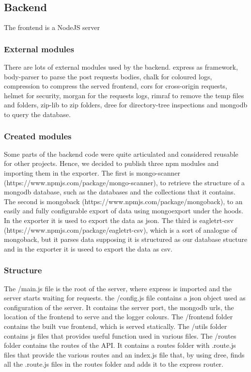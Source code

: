 \subsection{Backend}
The frontend is a NodeJS server

\subsubsection{External modules}
There are lots of external modules used by the backend.
express as framework, body-parser to parse the post requests bodies, chalk for coloured logs, compression to compress the served frontend, 
cors for cross-origin requests, helmet for security, morgan for the requests logs, rimraf to remove the temp files and folders, zip-lib to
zip folders, dree for directory-tree inspections and mongodb to query the database.

\subsubsection{Created modules}
Some parts of the backend code were quite articulated and considered reusable for other projects. 
Hence, we decided to publish three npm modules and importing them in the exporter.
The first is mongo-scanner (https://www.npmjs.com/package/mongo-scanner), to retrieve the structure of a mongodb database, such as the
databases and the collections that it contains.
The second is mongoback (https://www.npmjs.com/package/mongoback), to an easily and fully configurable export of data 
using mongoexport under the hoods. In the exporter it is used to export the data as json.
The third is eagletrt-csv (https://www.npmjs.com/package/eagletrt-csv), which is a sort of analogue of mongoback, but it parses 
data supposing it is structured as our database stucture and in the exporter it is useed to export the data as csv.

\subsubsection{Structure}
The /main.js file is the root of the server, where express is imported and the server starts waiting for requests.
the /config.js file contains a json object used as configuration of the server. It contains the server port, 
the mongodb urls, the location of the frontend to serve and the logger colours.
The /frontend folder contains the built vue frontend, which is served statically.
The /utils folder contains js files that provides useful function used in various files.
The /routes folder contains the routes of the API. It contains a routes folder with .route.js files that provide the various routes and an
index.js file that, by using dree, finds all the .route.js files in the routes folder and adds it to the express router.
